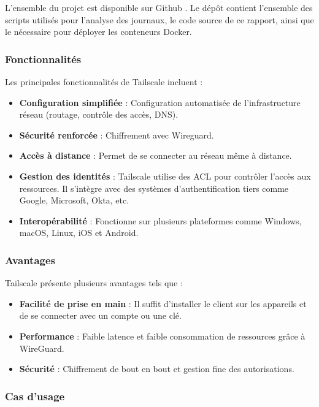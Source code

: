 \documentclass[12pt,letterpaper]{article}
\begin{document}
L'ensemble du projet est disponible sur Github \cite{EgourvesInf808prINF808a}.
Le dépôt contient l'ensemble des scripts utilisés pour l'analyse des journaux, le code source de ce rapport, ainsi que le nécessaire pour déployer les conteneurs Docker.

\subsubsection{Fonctionnalités}

Les principales fonctionnalités de Tailscale incluent :
\begin{itemize}
    \item \textbf{Configuration simplifiée} : Configuration automatisée de l'infrastructure réseau (routage, contrôle des accès, DNS).
    \item \textbf{Sécurité renforcée} : Chiffrement avec Wireguard.
    \item \textbf{Accès à distance} : Permet de se connecter au réseau même à distance.
    \item \textbf{Gestion des identités} : Tailscale utilise des ACL pour contrôler l'accès aux ressources. Il s'intègre avec des systèmes d'authentification tiers comme Google, Microsoft, Okta, etc.
    \item \textbf{Interopérabilité} : Fonctionne sur plusieurs plateformes comme Windows, macOS, Linux, iOS et Android.
\end{itemize}

\subsubsection{Avantages}

Tailscale présente plusieurs avantages tels que :
\begin{itemize}
    \item \textbf{Facilité de prise en main} : Il suffit d'installer le client sur les appareils et de se connecter avec un compte ou une clé.
    \item \textbf{Performance} : Faible latence et faible consommation de ressources grâce à WireGuard.
    \item \textbf{Sécurité} : Chiffrement de bout en bout et gestion fine des autorisations.
\end{itemize}

\subsubsection{Cas d'usage}
\end{document}
